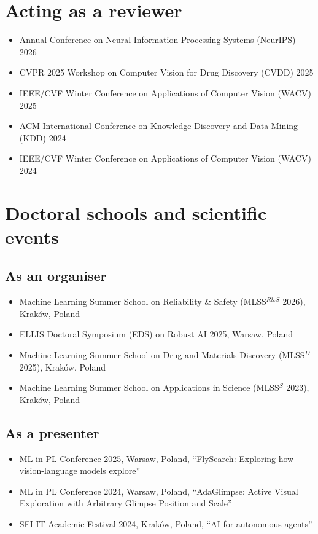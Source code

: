 \section{Acting as a reviewer}
\begin{itemize}
    \item {Annual Conference on Neural Information Processing Systems (NeurIPS) 2026}
    \item {CVPR 2025 Workshop on Computer Vision for Drug Discovery (CVDD) 2025}
    \item {IEEE/CVF Winter Conference on Applications of Computer Vision (WACV) 2025}
    \item {ACM International Conference on Knowledge Discovery and Data Mining (KDD) 2024}
    \item {IEEE/CVF Winter Conference on Applications of Computer Vision (WACV) 2024}
\end{itemize}

\section{Doctoral schools and scientific events}
\subsection{As an organiser}
\begin{itemize}
    \item Machine Learning Summer School on Reliability \& Safety (MLSS$^{R\&S}$ 2026), Kraków, Poland
    \item ELLIS Doctoral Symposium (EDS) on Robust AI 2025, Warsaw, Poland
    \item Machine Learning Summer School on Drug and Materials Discovery (MLSS$^{D}$ 2025), Kraków, Poland
    \item Machine Learning Summer School on Applications in Science (MLSS$^{S}$ 2023), Kraków, Poland
\end{itemize}

\subsection{As a presenter}
\begin{itemize}
    \item ML in PL Conference 2025, Warsaw, Poland, ``FlySearch: Exploring how vision-language models explore''
    \item ML in PL Conference 2024, Warsaw, Poland, ``AdaGlimpse: Active Visual Exploration with Arbitrary Glimpse Position and Scale''
    \item SFI IT Academic Festival 2024, Kraków, Poland, ``AI for autonomous agents''
\end{itemize}

